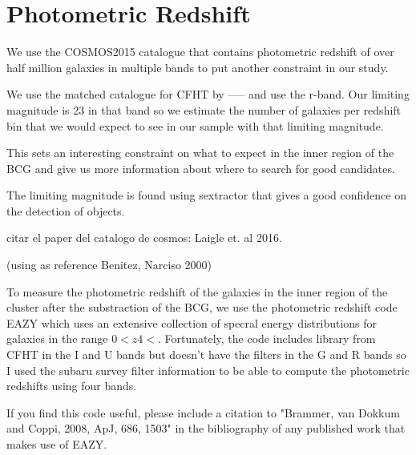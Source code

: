 \section{Photometric Redshift}

We use the COSMOS2015 catalogue that contains photometric redshift of over half million galaxies in multiple bands to put another constraint in our study.

We use the matched catalogue for CFHT by ----- and use the r-band. Our limiting magnitude is 23 in that band so we estimate the number of galaxies per redshift bin that we would expect to see in our sample with that limiting magnitude.

This sets an interesting constraint on what to expect in the inner region of the BCG and give us more information about where to search for good candidates.

The limiting magnitude is found using sextractor that gives a good confidence on the detection of objects.

citar el paper del catalogo de cosmos: Laigle et. al 2016.

(using as reference Benitez, Narciso 2000)

To measure the photometric redshift of the galaxies in the inner region of the cluster after the substraction of the BCG, we use the photometric redshift code EAZY which uses an extensive collection of specral energy distributions for galaxies in the range $0<z4<$. Fortunately, the code includes library from CFHT in the I and U bands but doesn't have the filters in the G and R bands so I used the subaru survey filter information to be able to compute the photometric redshifts using four bands.

If you find this code useful, please include a citation to "Brammer, van Dokkum and Coppi, 2008, ApJ, 686, 1503" in the bibliography of any published work that makes use of EAZY.